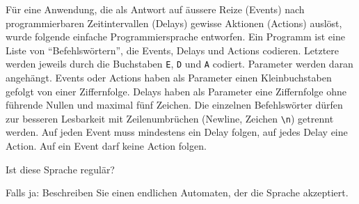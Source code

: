 Für eine Anwendung, die als Antwort auf äussere Reize (Events)
nach programmierbaren Zeitintervallen (Delays) gewisse Aktionen (Actions)
auslöst, wurde folgende einfache Programmiersprache entworfen. Ein
Programm ist eine Liste von ``Befehlswörtern'', die Events, Delays und Actions
codieren. Letztere werden
jeweils durch die Buchstaben {\tt E}, {\tt D} und {\tt A} codiert.
Parameter werden daran angehängt. Events oder Actions haben als Parameter
einen Kleinbuchstaben gefolgt von einer Ziffernfolge. Delays haben als
Parameter eine Ziffernfolge ohne führende Nullen und maximal fünf
Zeichen. Die einzelnen Befehlswörter dürfen zur besseren Lesbarkeit mit Zeilenumbrüchen
(Newline, Zeichen \verb+\n+) getrennt werden. Auf jeden Event muss mindestens
ein Delay folgen, auf jedes Delay eine Action. Auf ein Event darf keine Action folgen.
\begin{teilaufgaben}
\item Ist diese Sprache regulär?
\item Falls ja: Beschreiben Sie einen endlichen Automaten, der die
Sprache akzeptiert.
\end{teilaufgaben}


